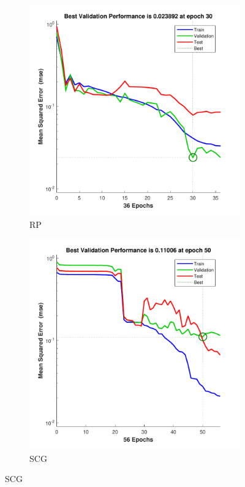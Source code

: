 \documentclass[12pt,a4paper]{article}
\begin{document}
\begin{CJK}{UTF8}{bsmi}
\begin{enumerate}
\begin{enumerate}
\begin{figure}[H]
		 	\end{figure}


		\begin{figure}[H]
			\centering
			\begin{subfigure}{.5\textwidth}
				\centering
				\includegraphics[width=1\linewidth]{iris_rp_per}
				\caption{RP}
				
			\end{subfigure}%
			\begin{subfigure}{.5\textwidth}
				\centering
				\includegraphics[width=1\linewidth]{iris_scg_per}
				\caption{SCG}
				

\end{subfigure}
\end{figure}
\end{enumerate}
\end{enumerate}
\end{CJK}
\end{document}
